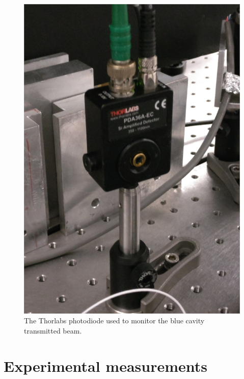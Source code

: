 \begin{figure}
	\centering
	\includegraphics[width=0.5\linewidth]{images/foto/fotodiodo.jpg}
	\caption{The Thorlabs photodiode used to monitor the blue cavity transmitted beam.}
	\label{fig:fotofotodiodo}
\end{figure}

\section{Experimental measurements}

